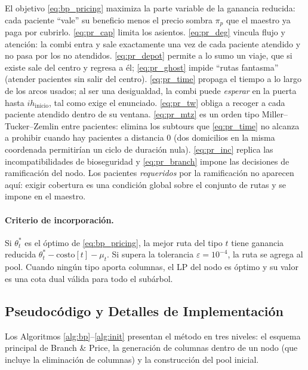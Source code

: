 \documentclass[12pt]{article}
\numberwithin{algorithm}{section}
\begin{document}
El objetivo \eqref{eq:bp_pricing} maximiza la parte variable de la ganancia reducida: cada paciente ``vale'' su beneficio menos el precio sombra $\pi_p$ que el maestro ya paga por cubrirlo. \eqref{eq:pr_cap} limita los asientos. \eqref{eq:pr_deg} vincula flujo y atención: la combi entra y sale exactamente una vez de cada paciente atendido y no pasa por los no atendidos. \eqref{eq:pr_depot} permite a lo sumo un viaje, que si existe sale del centro y regresa a él; \eqref{eq:pr_ghost} impide ``rutas fantasma'' (atender pacientes sin salir del centro). \eqref{eq:pr_time} propaga el tiempo a lo largo de los arcos usados; al ser una desigualdad, la combi puede \emph{esperar} en la puerta hasta $ih_{\text{inicio}}$, tal como exige el enunciado. \eqref{eq:pr_tw} obliga a recoger a cada paciente atendido dentro de su ventana. \eqref{eq:pr_mtz} es un orden tipo Miller--Tucker--Zemlin entre pacientes: elimina los subtours que \eqref{eq:pr_time} no alcanza a prohibir cuando hay pacientes a distancia $0$ (dos domicilios en la misma coordenada permitirían un ciclo de duración nula). \eqref{eq:pr_inc} replica las incompatibilidades de bioseguridad y \eqref{eq:pr_branch} impone las decisiones de ramificación del nodo. Los pacientes \emph{requeridos} por la ramificación no aparecen aquí: exigir cobertura es una condición global sobre el conjunto de rutas y se impone en el maestro.

\paragraph{Criterio de incorporación.} Si $\theta_t^*$ es el óptimo de \eqref{eq:bp_pricing}, la mejor ruta del tipo $t$ tiene ganancia reducida $\theta_t^* - \text{costo}[t] - \mu_t$. Si supera la tolerancia $\varepsilon = 10^{-4}$, la ruta se agrega al pool. Cuando ningún tipo aporta columnas, el LP del nodo es óptimo y su valor es una cota dual válida para todo el subárbol.

\subsection{Pseudocódigo y Detalles de Implementación}
\label{sec:challenger_pseudo}

Los Algoritmos \ref{alg:bp}--\ref{alg:init} presentan el método en tres niveles: el esquema principal de Branch \& Price, la generación de columnas dentro de un nodo (que incluye la eliminación de columnas) y la construcción del pool inicial.
\end{document}
